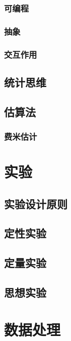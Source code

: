 \documentclass[]{book}
\begin{document}
\subsection{可编程}

\subsection{抽象}

\subsection{交互作用}

\section{统计思维}

\section{估算法}

\subsection{费米估计}

\chapter{实验}

\section{实验设计原则}

\section{定性实验}

\section{定量实验}

\section{思想实验}

\chapter{数据处理}
\end{document}
